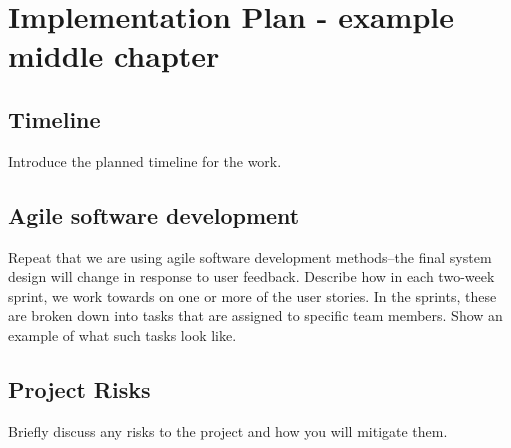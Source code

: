 \chapter{Implementation Plan - example middle chapter}

\section{Timeline}
Introduce the planned timeline for the work.

\section{Agile software development}
Repeat that we are using agile software development methods--the final system design will change in response to user feedback. Describe how in each two-week sprint, we work towards on one or more of the user stories. In the sprints, these are broken down into tasks that are assigned to specific team members. Show an example of what such tasks look like. 

\section{Project Risks}
Briefly discuss any risks to the project and how you will mitigate them.
